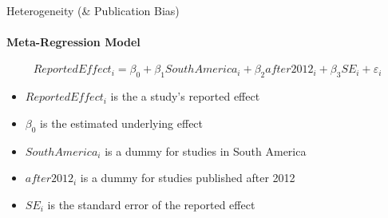 \documentclass{beamer}
\begin{document}


\begin{frame}{Heterogeneity (\& Publication Bias)}
\framesubtitle{Meta-Regression Model}
    $$ReportedEffect_i = \beta_0 + \beta_1 SouthAmerica_i + \beta_2 after2012_i + \beta_3 SE_i + \varepsilon_i$$
    \begin{itemize}
    \item $ReportedEffect_i$ is the a study's reported effect
        \item $\beta_0$ is the estimated underlying effect
        \item $SouthAmerica_i$ is a dummy for studies in South America
        \item $after2012_i$ is a dummy for studies published after 2012
        \item $SE_i$ is the standard error of the reported effect
    \end{itemize}
\end{frame}
\end{document}
